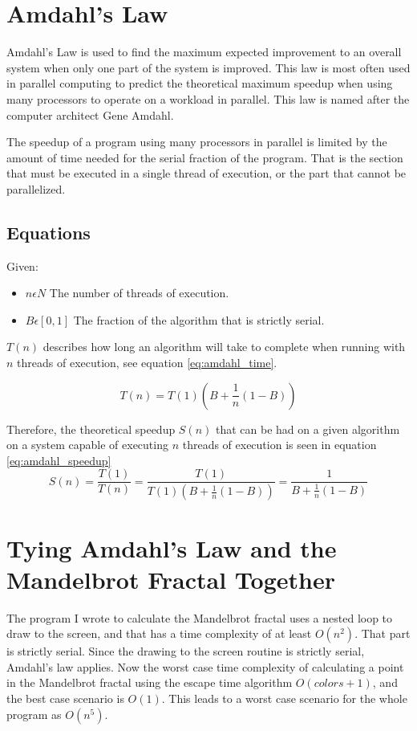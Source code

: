 \documentclass[11pt,oneside,letterpaper]{article}
\begin{document}
\section{Amdahl's Law}
Amdahl's Law is used to find the maximum expected improvement to an overall
system when only one part of the system is improved. This law is most often
used in parallel computing to predict the theoretical maximum speedup when
using many processors to operate on a workload in parallel. This law is named
after the computer architect Gene Amdahl.

The speedup of a program using many processors in parallel is limited by the
amount of time needed for the serial fraction of the program. That is the
section that must be executed in a single thread of execution, or the part
that cannot be parallelized.

\subsection{Equations}
\label{sec:Amdahl-Equations}
Given:
\begin{itemize}
  \item $n \epsilon N$ The number of threads of execution.
  \item $B \epsilon [0,1]$ The fraction of the algorithm that is strictly serial.
\end{itemize}

$T(n)$ describes how long an algorithm will take to complete when running
with $n$ threads of execution, see equation \eqref{eq:amdahl_time}.

\begin{equation} \label{eq:amdahl_time}
    T(n) = T(1)(B + \frac{1}{n}(1-B))
\end{equation}

Therefore, the theoretical speedup $S(n)$ that can be had on a given algorithm
on a system capable of executing $n$ threads of execution is seen in equation
\eqref{eq:amdahl_speedup}
\begin{equation} \label{eq:amdahl_speedup}
    S(n) = \frac{T(1)}{T(n)}
         = \frac{T(1)}{T(1)(B+\frac{1}{n}(1-B))}
         = \frac{1}{B+\frac{1}{n}(1-B)}
\end{equation}

\section{Tying Amdahl's Law and the Mandelbrot Fractal Together}
The program I wrote to calculate the Mandelbrot fractal uses a nested loop to
draw to the screen, and that has a time complexity of at least $O(n^2)$. That
part is strictly serial. Since the drawing to the screen routine is strictly
serial, Amdahl's law applies. Now the worst case time complexity of calculating a
point in the Mandelbrot fractal using the escape time algorithm 
$O({colors} + 1)$, and the best case scenario is $O(1)$. This leads to a worst
case scenario for the whole program as $O(n^5)$.
\end{document}
